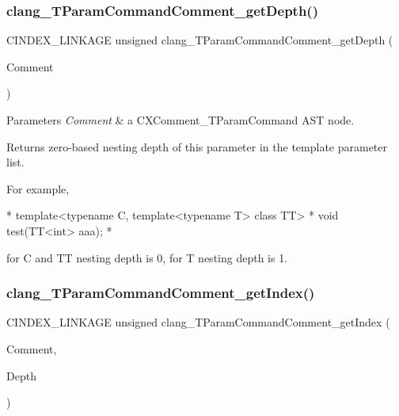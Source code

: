 \subsubsection{\texorpdfstring{clang\+\_\+\+T\+Param\+Command\+Comment\+\_\+get\+Depth()}{clang\_TParamCommandComment\_getDepth()}}
{\footnotesize\ttfamily C\+I\+N\+D\+E\+X\+\_\+\+L\+I\+N\+K\+A\+GE unsigned clang\+\_\+\+T\+Param\+Command\+Comment\+\_\+get\+Depth (\begin{DoxyParamCaption}\item[{\hyperlink{structCXComment}{C\+X\+Comment}}]{Comment }\end{DoxyParamCaption})}


\begin{DoxyParams}{Parameters}
{\em Comment} & a {\ttfamily C\+X\+Comment\+\_\+\+T\+Param\+Command} A\+ST node.\\
\hline
\end{DoxyParams}
\begin{DoxyReturn}{Returns}
zero-\/based nesting depth of this parameter in the template parameter list.
\end{DoxyReturn}
For example, \begin{DoxyVerb}*     template<typename C, template<typename T> class TT>
*     void test(TT<int> aaa);
* \end{DoxyVerb}
 for C and TT nesting depth is 0, for T nesting depth is 1. \mbox{\label{group__CINDEX__COMMENT_ga0b91d26f02a476076b6dc5b5eea59a8f}} 
\subsubsection{\texorpdfstring{clang\+\_\+\+T\+Param\+Command\+Comment\+\_\+get\+Index()}{clang\_TParamCommandComment\_getIndex()}}
{\footnotesize\ttfamily C\+I\+N\+D\+E\+X\+\_\+\+L\+I\+N\+K\+A\+GE unsigned clang\+\_\+\+T\+Param\+Command\+Comment\+\_\+get\+Index (\begin{DoxyParamCaption}\item[{\hyperlink{structCXComment}{C\+X\+Comment}}]{Comment,  }\item[{unsigned}]{Depth }\end{DoxyParamCaption})}


